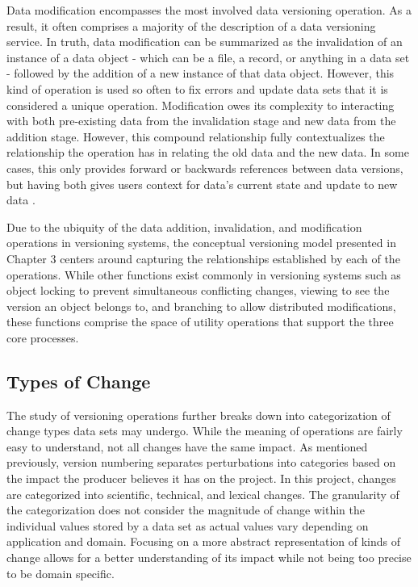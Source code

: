 Data modification encompasses the most involved data versioning operation.
As a result, it often comprises a majority of the description of a data versioning service.
In truth, data modification can be summarized as the invalidation of an instance of a data object - which can be a file, a record, or anything in a data set - followed by the addition of a new instance of that data object.
However, this kind of operation is used so often to fix errors and update data sets that it is considered a unique operation.
Modification owes its complexity to interacting with both pre-existing data from the invalidation stage and new data from the addition stage.
However, this compound relationship fully contextualizes the relationship the operation has in relating the old data and the new data.
In some cases, this only provides forward or backwards references between data versions, but having both gives users context for data's current state and update to new data \cite{Klein01ontologyversioning}.

Due to the ubiquity of the data addition, invalidation, and modification operations in versioning systems, the conceptual versioning model presented in Chapter 3 centers around capturing the relationships established by each of the operations.
While other functions exist commonly in versioning systems such as object locking to prevent simultaneous conflicting changes, viewing to see the version an object belongs to, and branching to allow distributed modifications, these functions comprise the space of utility operations that support the three core processes.

\subsection{Types of Change}

The study of versioning operations further breaks down into categorization of change types data sets may undergo.
While the meaning of operations are fairly easy to understand, not all changes have the same impact.
As mentioned previously, version numbering separates perturbations into categories based on the impact the producer believes it has on the project.
In this project, changes are categorized into scientific, technical, and lexical changes.
The granularity of the categorization does not consider the magnitude of change within the individual values stored by a data set as actual values vary depending on application and domain.
Focusing on a more abstract representation of kinds of change allows for a better understanding of its impact while not being too precise to be domain specific.

